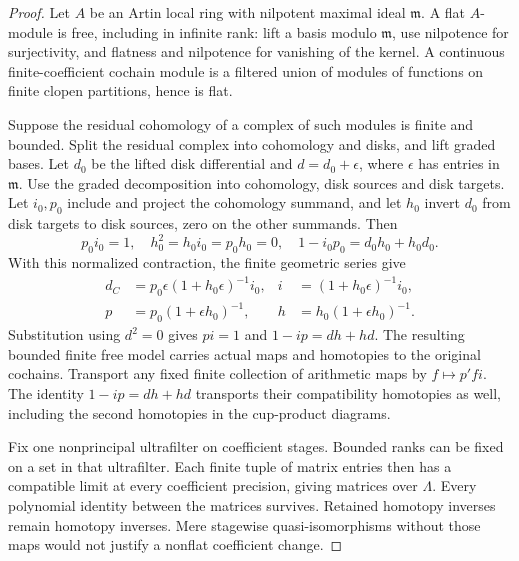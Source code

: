 \documentclass[11pt]{article}
\theoremstyle{definition}
\theoremstyle{remark}
\begin{document}
\begin{proof}\leavevmode
Let $A$ be an Artin local ring with nilpotent maximal ideal $\mathfrak m$.
A flat $A$-module is free, including in infinite rank: lift a basis
modulo $\mathfrak m$, use nilpotence for surjectivity, and flatness and
nilpotence for vanishing of the kernel. A continuous finite-coefficient
cochain module is a filtered union of modules of functions on finite
clopen partitions, hence is flat.

Suppose the residual cohomology of a complex of such modules is finite
and bounded. Split the residual complex into cohomology and disks,
and lift graded bases. Let $d_0$ be the lifted disk differential and
$d=d_0+\epsilon$, where $\epsilon$ has entries in $\mathfrak m$.
Use the graded decomposition into cohomology, disk sources and disk
targets. Let $i_0,p_0$ include and project the cohomology summand,
and let $h_0$ invert $d_0$ from disk targets to disk sources, zero
on the other summands. Then
\[
 p_0i_0=1,\quad h_0^2=h_0i_0=p_0h_0=0,\quad
 1-i_0p_0=d_0h_0+h_0d_0.
\]
With this normalized contraction, the finite geometric series give
\[
 \begin{aligned}
 d_C&=p_0\epsilon(1+h_0\epsilon)^{-1}i_0,&
 i&=(1+h_0\epsilon)^{-1}i_0,\\
 p&=p_0(1+\epsilon h_0)^{-1},&
 h&=h_0(1+\epsilon h_0)^{-1}.
 \end{aligned}
\]
Substitution using $d^2=0$ gives $pi=1$ and $1-ip=dh+hd$.
The resulting bounded finite free model carries actual maps and
homotopies to the original cochains. Transport any fixed finite
collection of arithmetic maps by $f\mapsto p'fi$. The identity
$1-ip=dh+hd$ transports their compatibility homotopies as well,
including the second homotopies in the cup-product diagrams.

Fix one nonprincipal ultrafilter on coefficient stages. Bounded ranks
can be fixed on a set in that ultrafilter. Each finite tuple of matrix
entries then has a compatible limit at every coefficient precision,
giving matrices over $\Lambda$. Every polynomial identity between
the matrices survives. Retained homotopy inverses remain homotopy
inverses. Mere stagewise quasi-isomorphisms without those maps would
not justify a nonflat coefficient change.
\end{proof}
\end{document}
